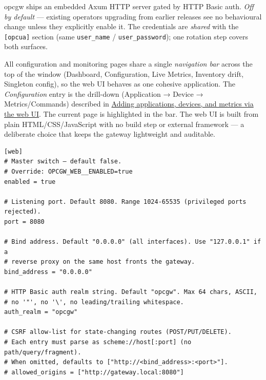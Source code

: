 opcgw ships an embedded Axum HTTP server gated by HTTP Basic auth. \emph{Off by default} --- existing operators upgrading from earlier releases see no behavioural change unless they explicitly enable it. The credentials are \emph{shared} with the \texttt{{[}opcua{]}} section (same \texttt{user\_name} / \texttt{user\_password}); one rotation step covers both surfaces.

All configuration and monitoring pages share a single \emph{navigation bar} across the top of the window (Dashboard, Configuration, Live Metrics, Inventory drift, Singleton config), so the web UI behaves as one cohesive application. The \emph{Configuration} entry is the drill-down (Application → Device → Metrics/Commands) described in \hyperref[sec-web-pickers]{Adding applications, devices, and metrics via the web UI}. The current page is highlighted in the bar. The web UI is built from plain HTML/CSS/JavaScript with no build step or external framework --- a deliberate choice that keeps the gateway lightweight and auditable.

\begin{lstlisting}
[web]
# Master switch — default false.
# Override: OPCGW_WEB__ENABLED=true
enabled = true

# Listening port. Default 8080. Range 1024-65535 (privileged ports rejected).
port = 8080

# Bind address. Default "0.0.0.0" (all interfaces). Use "127.0.0.1" if a
# reverse proxy on the same host fronts the gateway.
bind_address = "0.0.0.0"

# HTTP Basic auth realm string. Default "opcgw". Max 64 chars, ASCII,
# no '"', no '\', no leading/trailing whitespace.
auth_realm = "opcgw"

# CSRF allow-list for state-changing routes (POST/PUT/DELETE).
# Each entry must parse as scheme://host[:port] (no path/query/fragment).
# When omitted, defaults to ["http://<bind_address>:<port>"].
# allowed_origins = ["http://gateway.local:8080"]
\end{lstlisting}

